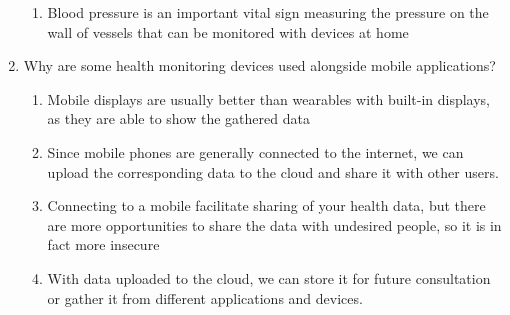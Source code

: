 \documentclass[10pt, twoside]{article}   	%
\begin{document}
\begin{enumerate}
\begin{enumerate}
             \item Blood pressure is an important vital sign measuring the pressure on the wall of vessels that can be monitored with devices at home
           \end {enumerate}       
       \item Why are some health monitoring devices used alongside mobile applications?
          \begin{enumerate}  
              \item Mobile displays are usually better than wearables with built-in displays, as they are able to show the gathered data
              \item Since mobile phones are generally connected to the internet, we can upload the corresponding data to the cloud and share it with other users.
              \item Connecting to a mobile facilitate sharing of your health data, but there are more opportunities to share the data with undesired people, so it is in fact more insecure
              \item With data uploaded to the cloud, we can store it for future consultation or gather it from different applications and devices.
           \end {enumerate}       

\end {enumerate} 
 
 
 
\end{document}
